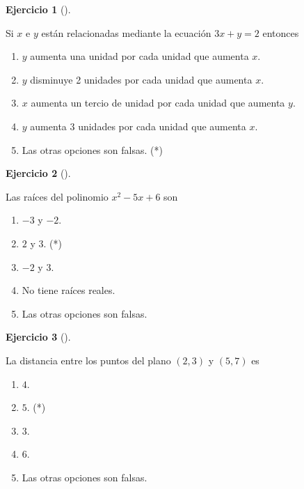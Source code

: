 \documentclass[
  a4paper,
]{scrreport}
\theoremstyle{definition}
\newtheorem{exercise}{Ejercicio}[chapter]
\theoremstyle{remark}
\begin{document}
\begin{exercise}[]\protect\hypertarget{exr-07}{}\label{exr-07}

Si \(x\) e \(y\) están relacionadas mediante la ecuación \(3x+y=2\)
entonces

\begin{enumerate}
\def\labelenumi{\alph{enumi}.}
\item
  \(y\) aumenta una unidad por cada unidad que aumenta \(x\).
\item
  \(y\) disminuye 2 unidades por cada unidad que aumenta \(x\).
\item
  \(x\) aumenta un tercio de unidad por cada unidad que aumenta \(y\).
\item
  \(y\) aumenta 3 unidades por cada unidad que aumenta \(x\).
\item
  Las otras opciones son falsas. (*)
\end{enumerate}

\end{exercise}

\begin{exercise}[]\protect\hypertarget{exr-08}{}\label{exr-08}

Las raíces del polinomio \(x^2-5x+6\) son

\begin{enumerate}
\def\labelenumi{\alph{enumi}.}
\item
  \(-3\) y \(-2\).
\item
  \(2\) y \(3\). (*)
\item
  \(-2\) y \(3\).
\item
  No tiene raíces reales.
\item
  Las otras opciones son falsas.
\end{enumerate}

\end{exercise}

\begin{exercise}[]\protect\hypertarget{exr-9}{}\label{exr-9}

La distancia entre los puntos del plano \((2,3)\) y \((5,7)\) es

\begin{enumerate}
\def\labelenumi{\alph{enumi}.}
\item
  \(4\).
\item
  \(5\). (*)
\item
  \(3\).
\item
  \(6\).
\item
  Las otras opciones son falsas.
\end{enumerate}

\end{exercise}
\end{document}
